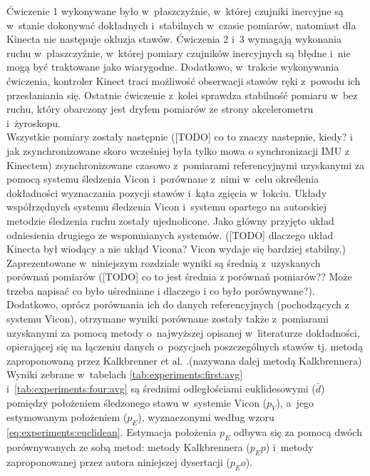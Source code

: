 Ćwiczenie 1 wykonywane było w~płaszczyźnie, w~której czujniki inercyjne są w~stanie dokonywać dokładnych i~stabilnych w~czasie pomiarów, natomiast dla Kinecta nie następuje okluzja stawów. Ćwiczenia 2 i~3 wymagają wykonania ruchu w~płaszczyźnie, w~której pomiary czujników inercyjnych są błędne i~nie mogą być traktowane jako wiarygodne. Dodatkowo, w~trakcie wykonywania ćwiczenia, kontroler Kinect traci możliwość obserwacji stawów ręki z~powodu ich przesłaniania się. Ostatnie ćwiczenie z~kolei sprawdza stabilność pomiaru w~bez ruchu, który obarczony jest dryfem pomiarów ze strony akcelerometru i~żyroskopu.\\

Wszystkie pomiary zostały następnie ([TODO] co to znaczy nastepnie, kiedy? i jak zsynchronizowane skoro wcześniej była tylko mowa o synchronizacji IMU z Kinectem) zsynchronizowane czasowo z~pomiarami referencyjnymi uzyskanymi za pomocą systemu śledzenia Vicon i~porównane z~nimi w~celu określenia dokładności wyznaczania pozycji stawów i~kąta zgięcia w~łokciu. Układy współrzędnych systemu śledzenia Vicon i~systemu opartego na autorskiej metodzie śledzenia ruchu zostały ujednolicone. Jako główny przyjęto układ odniesienia drugiego ze wspomnianych systemów. ([TODO] dlaczego układ Kinecta był wiodący a nie ukłąd Vicona? Vicon wydaje się bardziej stabilny.) Zaprezentowane w~niniejszym rozdziale wyniki są średnią z~uzyskanych porównań pomiarów ([TODO] co to jest średnia z porównań pomiarów?? Może trzeba napisać co było uśredniane i dlaczego i co było porównywane?). Dodatkowo, oprócz porównania ich do danych referencyjnych (pochodzących z systemu Vicon), otrzymane wyniki porównane zostały także z~pomiarami uzyskanymi za pomocą metody o~najwyższej opisanej w~literaturze dokładności, opierającej się na łączeniu danych o~pozycjach poszczególnych stawów tj. metodą zaproponowaną przez Kalkbrenner et al. \cite{Kalkbrenner2014}.(nazywana dalej metodą Kalkbrennera)\\
Wyniki zebrane w~tabelach \ref{tab:experiments:first:avg} i~\ref{tab:experiments:four:avg} są średnimi odległościami euklidesowymi ($\bar{d}$) pomiędzy położeniem śledzonego stawu w~systemie Vicon ($p_V$), a~jego estymowanym położeniem ($p_E$), wyznaczonymi według wzoru \eqref{eq:experiments:euclidean}. Estymacja położenia $p_E$ odbywa się za pomocą dwóch porównywanych ze sobą metod: metody Kalkbrennera ($p_Ep$) i~metody zaproponowanej przez autora niniejszej dysertacji ($p_Eo$). %


